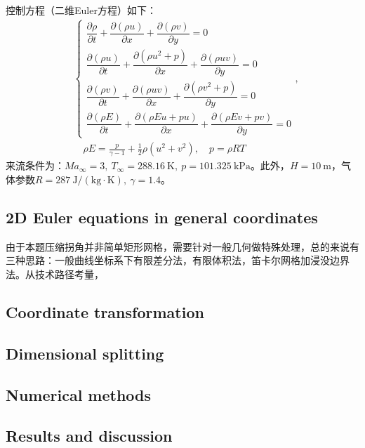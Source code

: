 \documentclass[11pt]{article}
\begin{document}
控制方程（二维Euler方程）如下：
\begin{align}
	 & \left\{\begin{array}{l}
		\dfrac{\partial\rho}{\partial t}+\dfrac{\partial(\rho u)}{\partial x}+\dfrac{\partial(\rho v)}{\partial y}=0           \\[8pt]
		\dfrac{\partial(\rho u)}{\partial t}+\dfrac{\partial(\rho u^2+p)}{\partial x}+\dfrac{\partial(\rho u v)}{\partial y}=0 \\[8pt]
		\dfrac{\partial(\rho v)}{\partial t}+\dfrac{\partial(\rho uv)}{\partial x}+\dfrac{\partial(\rho v^2+p)}{\partial y}=0  \\[8pt]
		\dfrac{\partial(\rho E)}{\partial t}+\dfrac{\partial(\rho Eu+pu)}{\partial x}+\dfrac{\partial(\rho Ev+pv)}{\partial y}=0
	\end{array}\right., \label{eqn:euler2}              \\
	 & \quad \rho E=\frac{p}{\gamma-1}+\frac{1}{2}\rho(u^2+v^2),\quad p=\rho R T
\end{align}
来流条件为：$Ma_\infty=3,\ T_\infty=288.16\ \mathrm{K},\ p=101.325\ \mathrm{kPa}$。此外，$H=10\ \mathrm{m}$，气体参数$R=287\ \mathrm{J/(kg\cdot K)},\ \gamma=1.4$。

\subsection{2D Euler equations in general coordinates}
由于本题压缩拐角并非简单矩形网格，需要针对一般几何做特殊处理，总的来说有三种思路：一般曲线坐标系下有限差分法，有限体积法，笛卡尔网格加浸没边界法。从技术路径考量，

\subsection{Coordinate transformation}

\subsection{Dimensional splitting}

\subsection{Numerical methods}

\subsection{Results and discussion}

\newpage


\end{document}
